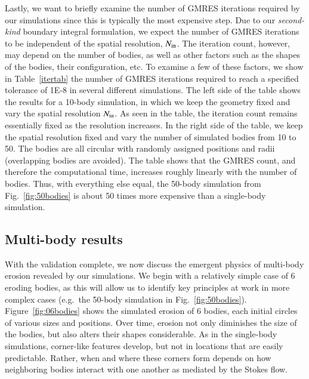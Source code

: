 \documentclass[preprint, 10pt]{elsarticle}
\begin{document}
Lastly, we want to briefly examine the number of GMRES iterations required by our simulations since this is typically the most expensive step. Due to our {\em second-kind} boundary integral formulation, we expect the number of GMRES iterations to be independent of the spatial resolution, $N_{\mathrm{in}}$. The iteration count, however, may depend on the number of bodies, as well as other factors such as the shapes of the bodies, their configuration, etc. To examine a few of these factors, we show in Table~\ref{itertab} the number of GMRES iterations required to reach a specified tolerance of 1E-8 in several different simulations. The left side of the table shows the results for a 10-body simulation, in which we keep the geometry fixed and vary the spatial resolution $N_{\mathrm{in}}$. As seen in the table, the iteration count remains essentially fixed as the resolution increases. In the right side of the table, we keep the spatial resolution fixed and vary the number of simulated bodies from 10 to 50. The bodies are all circular with randomly assigned positions and radii (overlapping bodies are avoided). The table shows that the GMRES count, and therefore the computational time, increases roughly linearly with the number of bodies. Thus, with everything else equal, the 50-body simulation from Fig.~\ref{fig:50bodies} is about 50 times more expensive than a single-body simulation.


\subsection{Multi-body results}

With the validation complete, we now discuss the emergent physics of
multi-body erosion revealed by our simulations. We begin with a relatively simple case of 6 eroding bodies, as this will allow us to identify key principles at work in more complex cases (e.g.~the 50-body simulation in Fig.~\ref{fig:50bodies}). Figure~\ref{fig:06bodies} shows the simulated erosion of 6 bodies, each initial circles of various sizes and positions. Over time, erosion not only diminishes the size of the bodies, but also alters their shapes considerable. As in the single-body simulations, corner-like features develop, but not in locations that are easily predictable. Rather, when and where these corners form depends on how neighboring bodies interact with one another as mediated by the Stokes flow.
\end{document}
